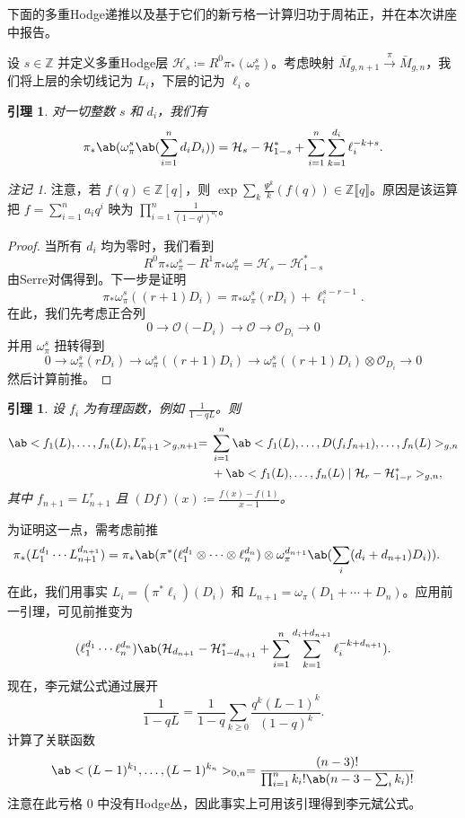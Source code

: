 \documentclass{amsart}
\newtheorem{lem}[thm]{引理}
\theoremstyle{definition}
\theoremstyle{remark}
\newtheorem{rmk}[thm]{注记}
\theoremstyle{plain}
\theoremstyle{definition}
\theoremstyle{remark}
\newcommand{\Z}{\mathbb{Z}}
\newcommand{\mc}[1]{\mathcal{#1}}
\newcommand{\1}{\mathbf{1}}
\newcommand{\2}{\mathbf{2}}
\newcommand{\3}{\mathbf{3}}
\newcommand{\ps}[1]{\llbracket #1 \rrbracket}
\begin{document}
下面的多重Hodge递推以及基于它们的新亏格一计算归功于周祐正，并在本次讲座中报告。

设 \(s \in \Z\) 并定义多重Hodge层 \(\mc{H}_s \coloneqq R^0 \pi_* (\omega_{\pi}^s)\)。考虑映射 \(\bar{M}_{g,n+1} \xrightarrow{\pi} \bar{M}_{g,n}\)，我们将上层的余切线记为 \(L_i\)，下层的记为 \(\ell_i\)。

\begin{lem}
    对一切整数 \(s\) 和 \(d_i\)，我们有
    \[ \pi_*\ab(\omega_{\pi}^s\ab(\sum_{i=1}^n d_i D_i)) = \mc{H}_s-\mc{H}_{1-s}^* + \sum_{i=1}^n \sum_{k=1}^{d_i} \ell_i^{-k+s}. \]
\end{lem}

\begin{rmk}
    注意，若 \(f(q) \in \Z[q]\)，则 \(\exp \sum_k \frac{\Psi^k}{k} (f(q)) \in \Z \ps{q}\)。原因是该运算把 \(f = \sum_{i=1}^{n} a_i q^i\) 映为 \(\prod_{i=1}^n \frac{1}{(1-q^i)^{a_i}}\)。
\end{rmk}

\begin{proof}
    当所有 \(d_i\) 均为零时，我们看到
    \[ R^0 \pi_* \omega_{\pi}^s - R^1 \pi_* \omega_{\pi}^s = \mc{H}_s - \mc{H}_{1-s}^* \]
    由Serre对偶得到。下一步是证明
    \[ \pi_* \omega_{\pi}^s ((r+1)D_i) = \pi_* \omega_{\pi}^s(r D_i) + \ell_i^{s-r-1}. \]
    在此，我们先考虑正合列
    \[ 0 \to \mc{O} (-D_i) \to \mc{O} \to \mc{O}_{D_i} \to 0 \]
    并用 \(\omega_{\pi}^s\) 扭转得到
    \[ 0 \to \omega_{\pi}^s(r D_i) \to \omega_{\pi}^s ((r+1)D_i) \to \omega_{\pi}^s ((r+1)D_i) \otimes \mc{O}_{D_i} \to 0 \]
    然后计算前推。
\end{proof}

\begin{lem}
    设 \(f_i\) 为有理函数，例如 \(\frac{1}{1-q L}\)。则
    \begin{align*}
        \ab<f_1(L), \ldots, f_n(L), L_{n+1}^r>_{g, n+1} ={}& \sum_{i=1}^n \ab<f_1(L), \ldots, D(f_i f_{n+1}), \ldots, f_n(L)>_{g, n} \\
        &+ \ab<f_1(L), \ldots, f_n(L) \mid \mc{H}_r - \mc{H}_{1-r}^*>_{g,n},
    \end{align*}
    其中 \(f_{n+1} = L_{n+1}^r\) 且 \((Df)(x) \coloneqq \frac{f(x)-f(1)}{x-1}\)。
\end{lem}

为证明这一点，需考虑前推
\begin{align*}
    \pi_* (L_1^{d_1} \cdots L_{n+1}^{d_{n+1}}) &= \pi_* \ab(\pi^*(\ell_1^{d_1} \otimes \cdots \otimes \ell_n^{d_n}) \otimes \omega_{\pi}^{d_{n+1}}\ab(\sum_i (d_i+d_{n+1})D_i)).
\end{align*}
在此，我们用事实 \(L_i = (\pi^* \ell_i)(D_i)\) 和 \(L_{n+1} = \omega_{\pi}(D_1 + \cdots + D_n)\)。应用前一引理，可见前推变为
\[ (\ell_1^{d_1} \cdots \ell_n^{d_n})\ab(\mc{H}_{d_{n+1}} - \mc{H}_{1-d_{n+1}}^* + \sum_{i=1}^n \sum_{k=1}^{d_i + d_{n+1}} \ell_i^{-k+d_{n+1}}). \]
现在，李元斌公式通过展开
\[ \frac{1}{1-qL} = \frac{1}{1-q} \sum_{k \geq 0} \frac{q^k(L-1)^k}{(1-q)^k}. \]
计算了关联函数
\[ \ab<(L-1)^{k_1}, \ldots, (L-1)^{k_n}>_{0,n} = \frac{(n-3)!}{\prod_{i=1}^n k_i! \ab(n-3-\sum_i k_i)!} \]
注意在此亏格 \(0\) 中没有Hodge丛，因此事实上可用该引理得到李元斌公式。
\end{document}
